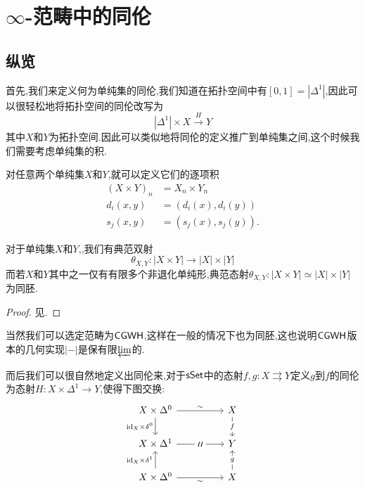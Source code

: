 \chapter{$\infty$-范畴中的同伦}
\section{纵览}
首先,我们来定义何为单纯集的同伦,我们知道在拓扑空间中有$[0,1]=|\Delta^1|$,因此可以很轻松地将拓扑空间的同伦改写为
\[
    |\Delta^1|\times X \xrightarrow{H} Y
\]
其中$X$和$Y$为拓扑空间.因此可以类似地将同伦的定义推广到单纯集之间,这个时候我们需要考虑单纯集的积.
\begin{definition}[单纯集的积]
    对任意两个单纯集$X$和$Y$,就可以定义它们的逐项积
\begin{align*}
    (X\times Y)_n &= X_n \times Y_n\\
    d_i(x,y) &= (d_i(x),d_i(y))\\
    s_j(x,y) &= (s_j(x),s_j(y)).
\end{align*}
\end{definition}
\begin{theorem}\label{The:单纯集的积的几何意义}
    对于单纯集$X$和$Y$,,我们有典范双射
    \[
    \theta_{X,Y}:|X\times Y| \to |X|\times |Y|
    \]
    而若$X$和$Y$其中之一仅有有限多个非退化单纯形,典范态射$\theta_{X,Y}:|X\times Y| \simeq |X|\times |Y|$为同胚.
\end{theorem}
\begin{proof}
    见\parencite[\href{https://kerodon.net/tag/013E}{013E}]{Kerodon}.
\end{proof}
\begin{remark}
    当然我们可以选定范畴为$\mathsf{CGWH}$,这样在一般的情况下也为同胚,这也说明$\mathsf{CGWH}$版本的几何实现$|-|$是保有限$\underleftarrow{\lim}$的.
\end{remark}
而后我们可以很自然地定义出同伦来,对于$\mathsf{sSet}$中的态射$f,g : X \rightrightarrows Y$定义$g$到$f$的同伦为态射$H: X\times \Delta^1 \to Y$,使得下图交换:
\[\begin{tikzcd}
	{X\times \Delta^0} && X \\
	{X\times \Delta^1} && Y \\
	{X\times \Delta^0} && X
	\arrow["\sim", from=1-1, to=1-3]
	\arrow["{\identity_X \times \delta^0}"', from=1-1, to=2-1]
	\arrow["f"{description}, from=1-3, to=2-3]
	\arrow["H"{description}, from=2-1, to=2-3]
	\arrow["{\identity_X\times \delta^1}", from=3-1, to=2-1]
	\arrow["\sim"', from=3-1, to=3-3]
	\arrow["g"{description}, from=3-3, to=2-3]
\end{tikzcd}\]

